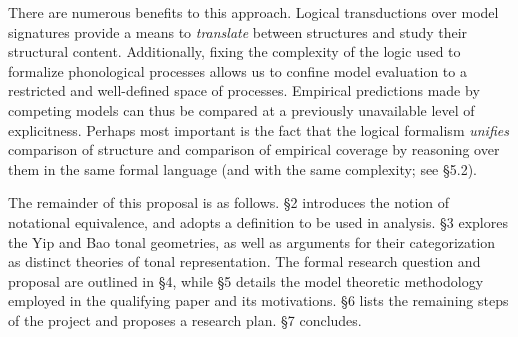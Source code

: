 \documentclass{article}
\begin{document}
There are numerous benefits to this approach. Logical transductions over model signatures provide a means to \emph{translate} between structures and study their structural content. Additionally, fixing the complexity of the logic used to formalize phonological processes allows us to confine model evaluation to a restricted and well-defined space of processes. Empirical predictions made by competing models can thus be compared at a previously unavailable level of explicitness. Perhaps most important is the fact that the logical formalism \emph{unifies} comparison of structure and comparison of empirical coverage by reasoning over them in the same formal language (and with the same complexity; see \S5.2). \par
The remainder of this proposal is as follows. \S2 introduces the notion of notational equivalence, and adopts a definition to be used in analysis. \S3 explores the Yip and Bao tonal geometries, as well as arguments for their categorization as distinct theories of tonal representation. The formal research question and proposal are outlined in \S4, while \S5 details the model theoretic methodology employed in the qualifying paper and its motivations. \S6 lists the remaining steps of the project and proposes a research plan. \S7 concludes.
\end{document}
